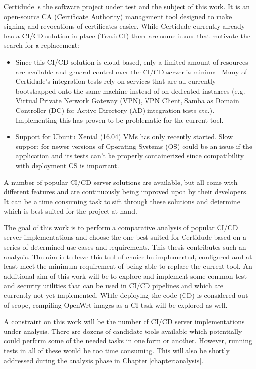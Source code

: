 Certidude is the software project under test and the subject of this work. It is an open-source CA (Certificate Authority) management tool designed to make signing and revocations of certificates easier.\cite{certidude} While Certidude currently already has a CI/CD solution in place (TravisCI) there are some issues that motivate the search for a replacement:
\begin{itemize}
    \item Since this CI/CD solution is cloud based, only a limited amount of resources are available and general control over the CI/CD server is minimal. Many of Certidude's integration tests rely on services that are all currently bootstrapped onto the same machine instead of on dedicated instances (e.g. Virtual Private Network Gateway (VPN), VPN Client, Samba as Domain Controller (DC) for Active Directory (AD) integration tests etc.). Implementing this has proven to be problematic for the current tool.
    \item Support for Ubuntu Xenial (16.04) VMs has only recently started.\cite{travis-os-support} Slow support for newer versions of Operating Systems (OS) could be an issue if the application and its tests can't be properly containerized since compatibility with deployment OS is important.
\end{itemize}

\pagebreak

A number of popular CI/CD server solutions are available, but all come with different features and are continuously being improved upon by their developers. It can be a time consuming task to sift through these solutions and determine which is best suited for the project at hand.

The goal of this work is to perform a comparative analysis of popular CI/CD server implementations and choose the one best suited for Certidude based on a series of determined use cases and requirements. This thesis contributes such an analysis. The aim is to have this tool of choice be implemented, configured and at least meet the minimum requirement of being able to replace the current tool. An additional aim of this work will be to explore and implement some common test and security utilities that can be used in CI/CD pipelines and which are currently not yet implemented. While deploying the code (CD) is considered out of scope, compiling OpenWrt images as a CI task will be explored as well.

A constraint on this work will be the number of CI/CD server implementations under analysis. There are dozens of candidate tools available which potentially could perform some of the needed tasks in one form or another. However, running tests in all of these would be too time consuming. This will also be shortly addressed during the analysis phase in Chapter \ref{chapter:analysis}.

